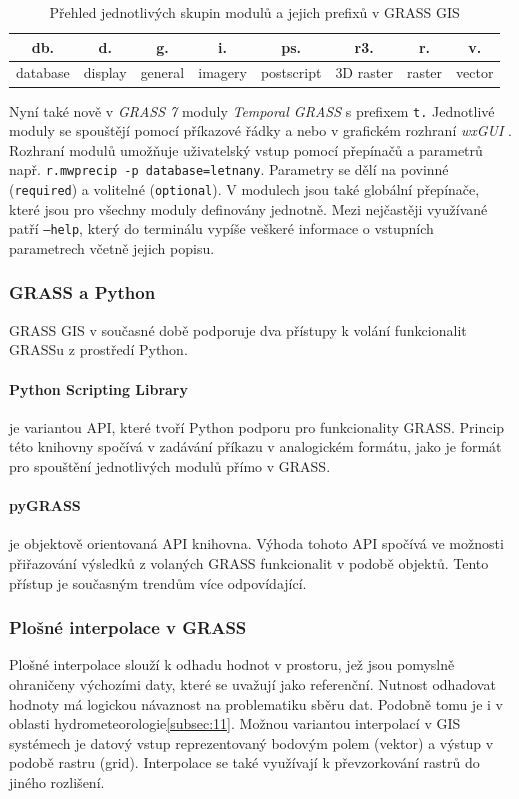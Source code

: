 \documentclass[a4paper,12pt,oneside]{report}
\begin{document}
\begin{table}[h]
\centering
\begin{tabular}{|cccccccc|}
\hline
db. & d. & g. & i. & ps. & r3. & r. & v. \\
\hline \hline
database & display & general & imagery & postscript & 3D raster & raster & vector \\ \hline
\end{tabular}
\caption{Přehled jednotlivých skupin modulů a jejich prefixů v GRASS GIS}
\label{tab:module}
\end{table}


Nyní také nově v \textit{GRASS 7} moduly \textit{Temporal GRASS} s prefixem \texttt{t.} Jednotlivé moduly se spouštějí pomocí příkazové řádky a nebo v grafickém rozhraní \textit{wxGUI} . Rozhraní modulů umožňuje uživatelský vstup pomocí přepínačů a parametrů např. \texttt{r.mwprecip -p database=letnany}. Parametry se dělí na povinné (\texttt{required}) a volitelné (\texttt{optional}). V modulech jsou také globální přepínače, které jsou pro všechny moduly definovány jednotně. Mezi nejčastěji využívané patří \texttt{--help}, který do terminálu vypíše veškeré informace o vstupních parametrech včetně jejich  popisu.

\subsubsection*{GRASS a Python}
GRASS GIS v současné době podporuje dva přístupy k volání funkcionalit GRASSu z prostředí Python.
\paragraph*{Python Scripting Library} je variantou API, které tvoří Python podporu pro funkcionality GRASS. Princip této knihovny spočívá v zadávání příkazu v analogickém formátu, jako je formát pro spouštění jednotlivých modulů přímo v GRASS.
\paragraph*{pyGRASS} je objektově orientovaná API knihovna. Výhoda tohoto API spočívá ve možnosti přiřazování výsledků z volaných GRASS funkcionalit v podobě objektů. Tento přístup je současným trendům více odpovídající.

\subsubsection*{Plošné interpolace v GRASS }
\label{sec:plostneinterpolace}
Plošné interpolace slouží k odhadu hodnot v prostoru, jež jsou pomyslně ohraničeny výchozími daty, které se uvažují jako referenční. Nutnost odhadovat hodnoty má logickou návaznost na problematiku sběru dat.  Podobně tomu je i v oblasti hydrometeorologie\ref{subsec:11}. Možnou variantou interpolací v GIS systémech je datový vstup reprezentovaný bodovým polem (vektor) a výstup v podobě rastru (grid). Interpolace se také využívají k převzorkování rastrů do jiného rozlišení.
\end{document}
